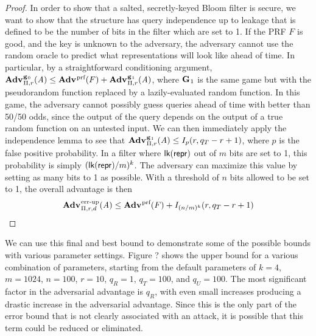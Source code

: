 \begin{proof}
In order to show that a salted, secretly-keyed Bloom filter is secure, we want to show that the structure has query independence up to leakage that is defined to be the number of bits in the filter which are set to 1. If the PRF $F$ is good, and the key is unknown to the adversary, the adversary cannot use the random oracle to predict what representations will look like ahead of time. In particular, by a straightforward conditioning argument, $\Adv{\game_0}_{\struct,r}(\advA) \le \Adv{\prf}(F) + \Adv{\game_1}_{\struct,r}(\advA)$, where $\mathbf{G}\hspace{0.5pt}_1$ is the same game but with the pseudorandom function replaced by a lazily-evaluated random function. In this game, the adversary cannot possibly guess queries ahead of time with better than 50/50 odds, since the output of the query depends on the output of a true random function on an untested input. We can then immediately apply the independence lemma to see that $\Adv{\game_1}_{\struct,r}(\advA) \le I_p(r, q_T-r+1)$, where $p$ is the false positive probability. In a filter where $\textsf{lk}(\mathsf{repr})$ out of $m$ bits are set to 1, this probability is simply $(\textsf{lk}(\mathsf{repr})/m)^k$. The adversary can maximize this value by setting as many bits to 1 as possible. With a threshold of $n$ bits allowed to be set to 1, the overall advantage is then
$$\Adv{\errep}_{\struct,r,d}(\advA) \le \Adv{\prf}(F) + I_{(n/m)^k}(r, q_T-r+1)$$
\end{proof}



We can use this final and best bound to demonstrate some of the possible bounds with various parameter settings. Figure ? shows the upper bound for a various combination of parameters, starting from the default parameters of $k = 4$, $m = 1024$, $n = 100$, $r = 10$, $q_R = 1$, $q_T = 100$, and $q_U = 100$. The most significant factor in the adversarial advantage is $q_R$, with even small increases producing a drastic increase in the adversarial advantage. Since this is the only part of the error bound that is not clearly associated with an attack, it is possible that this term could be reduced or eliminated.

